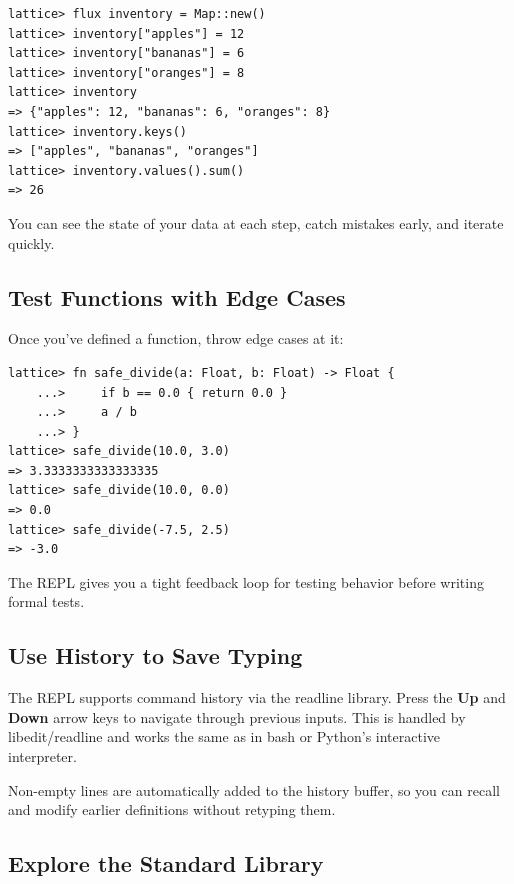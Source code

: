 \begin{lstlisting}[language=Lattice, numbers=none]
lattice> flux inventory = Map::new()
lattice> inventory["apples"] = 12
lattice> inventory["bananas"] = 6
lattice> inventory["oranges"] = 8
lattice> inventory
=> {"apples": 12, "bananas": 6, "oranges": 8}
lattice> inventory.keys()
=> ["apples", "bananas", "oranges"]
lattice> inventory.values().sum()
=> 26
\end{lstlisting}

You can see the state of your data at each step, catch mistakes early, and iterate quickly.

\subsection{Test Functions with Edge Cases}\label{subsec:edge-cases}

Once you've defined a function, throw edge cases at it:

\begin{lstlisting}[language=Lattice, numbers=none]
lattice> fn safe_divide(a: Float, b: Float) -> Float {
    ...>     if b == 0.0 { return 0.0 }
    ...>     a / b
    ...> }
lattice> safe_divide(10.0, 3.0)
=> 3.3333333333333335
lattice> safe_divide(10.0, 0.0)
=> 0.0
lattice> safe_divide(-7.5, 2.5)
=> -3.0
\end{lstlisting}

The REPL gives you a tight feedback loop for testing behavior before writing formal tests.

\subsection{Use History to Save Typing}\label{subsec:history}

The REPL supports command history via the readline library.
Press the \textbf{Up} and \textbf{Down} arrow keys to navigate through previous inputs.
This is handled by libedit/readline and works the same as in bash or Python's interactive interpreter.

Non-empty lines are automatically added to the history buffer, so you can recall and modify earlier definitions without retyping them.

\subsection{Explore the Standard Library}\label{subsec:explore-stdlib}

